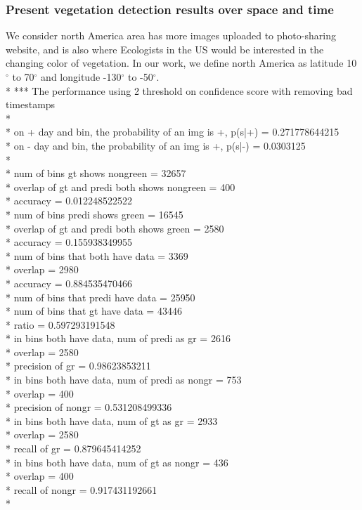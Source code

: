 \subsubsection*{Present vegetation detection results over space and time}

We consider north America area has more images uploaded to photo-sharing website, and is also where Ecologists in the US would be interested in the changing color of vegetation. In our work, we define north America as latitude 10$^{\circ}$ to 70$^{\circ}$ and longitude -130$^{\circ}$ to -50$^{\circ}$.
\hfill \break
\hfill \break
{}
\\*
*** The performance using 2 threshold on confidence score with removing bad timestamps\\*
\\*
on + day and bin, the probability of an img is +, p(s|+) = 0.271778644215\\*
on - day and bin, the probability of an img is +, p(s|-) = 0.0303125\\*
\\*
num of bins gt shows nongreen = 32657\\*
overlap of gt and predi both shows nongreen = 400\\*
accuracy = 0.012248522522\\*
num of bins predi shows green = 16545\\*
overlap of gt and predi both shows green = 2580\\*
accuracy = 0.155938349955\\*
num of bins that both have data = 3369\\*
overlap = 2980\\*
accuracy = 0.884535470466\\*
num of bins that predi have data = 25950\\*
num of bins that gt have data = 43446\\*
ratio = 0.597293191548\\*
in bins both have data, num of predi as gr = 2616\\*
overlap = 2580\\*
precision of gr = 0.98623853211\\*
in bins both have data, num of predi as nongr = 753\\*
overlap = 400\\*
precision of nongr = 0.531208499336\\*
in bins both have data, num of gt as gr = 2933\\*
overlap = 2580\\*
recall of gr = 0.879645414252\\*
in bins both have data, num of gt as nongr = 436\\*
overlap = 400\\*
recall of nongr = 0.917431192661\\*

